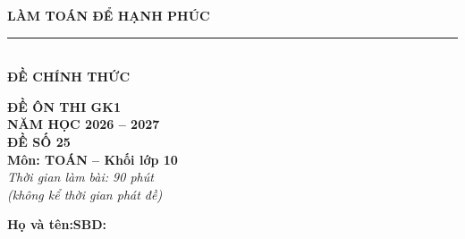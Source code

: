 \documentclass[12pt,a4paper]{article}
\begin{document}
\noindent
\begin{minipage}[c]{0.38\textwidth}
    \centering
    \textbf{LÀM TOÁN ĐỂ HẠNH PHÚC}\\[-2pt]
    \rule{3.2cm}{0.6pt}\\[3pt]
    \textbf{ĐỀ CHÍNH THỨC}
\end{minipage}\hfill
\begin{minipage}[c]{0.35\textwidth}
    \centering
    \textbf{ĐỀ ÔN THI GK1}\\
    \textbf{NĂM HỌC 2026 -- 2027}\\[2pt]
    \textbf{ĐỀ SỐ 25}\\
    \textbf{Môn: TOÁN -- Khối lớp 10}\\
    \textit{\small Thời gian làm bài: 90 phút\\(không kể thời gian phát đề)}
\end{minipage}

\vspace{0.08cm}
\noindent
\begin{minipage}[b]{0.78\textwidth}
    \textbf{Họ và tên:}\dotfill\textbf{SBD:}\makebox[3.5cm]{\dotfill}
\end{minipage}\hfill
\begin{minipage}[b]{0.20\textwidth}
    \hfill
    \setlength{\fboxrule}{0.8pt}%
\end{minipage}
\vspace{0.08cm}
\end{document}
